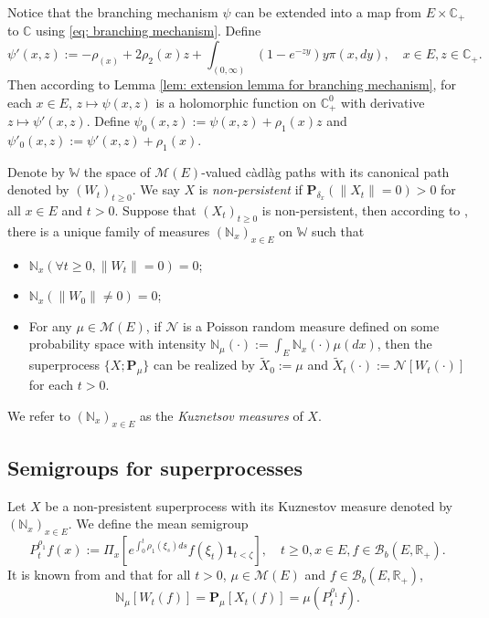 \documentclass[12pt,a4paper]{amsart}
\theoremstyle{plain}
\theoremstyle{definition}
\numberwithin{equation}{section}
\begin{document}
    Notice that the branching mechanism $\psi$ can be extended into a map from $E \times \mathbb C_+$ to $\mathbb C$ using \eqref{eq: branching mechanism}.
    Define
\begin{equation}
    \psi'(x,z):= - \rho_(x) + 2\rho_2(x) z + \int_{(0,\infty)} (1-e^{-zy})y\pi(x,dy),
    \quad x\in E, z\in \mathbb C_+.
\end{equation}
    Then according to Lemma \ref{lem: extension lemma for branching mechanism}, for each $x \in E$, $z \mapsto \psi(x,z)$ is a holomorphic function on $\mathbb C_+^0$ with derivative $z \mapsto \psi'(x,z)$.
    Define $\psi_0(x,z) := \psi(x,z)+ \rho_1(x)z $ and $\psi'_0(x,z) := \psi'(x,z) + \rho_1(x)$.

    Denote by $\mathbb W$ the space of $\mathcal M(E)$-valued c\`{a}dl\`{a}g paths with its canonical path denoted by $(W_t)_{t\geq 0}$.
    We say $X$ is \emph{non-persistent} if $\mathbf P_{\delta_x}(\|X_t\|= 0) > 0$ for all $x\in E$ and $t> 0$.
    Suppose that $(X_t)_{t\geq 0}$ is non-persistent, then according to \cite[Section 8.4]{Li2011Measure-valued},
    there is a unique family of measures $(\mathbb N_x)_{x\in E}$ on $\mathbb W$ such that
\begin{itemize}
\item
    $\mathbb N_x (\forall t \geq 0, \|W_t\|=0) =0$;
\item
    $\mathbb N_x(\|W_0 \|\neq 0) = 0$;
\item
    For any $\mu \in \mathcal M(E)$, if $\mathcal N$ is a Poisson random measure defined on some probability space
    with intensity $\mathbb N_\mu(\cdot):= \int_E \mathbb N_x(\cdot )\mu(dx)$,
    then the superprocess $\{X;\mathbf P_\mu\}$ can be realized by $\widetilde X_0 := \mu$ and $\widetilde X_t(\cdot) := \mathcal N[W_t(\cdot)]$ for each $t>0$.
\end{itemize}
    We refer to $(\mathbb N_x)_{x\in E}$ as the \emph{Kuznetsov measures} of $X$.
\subsection{{Semigroups for superprocesses}}
\label{sec: definition of vf}
    Let $X$ be a non-presistent superprocess with its Kuznestov measure denoted by $(\mathbb N_x)_{x\in E}$.
    We define the mean semigroup
\begin{equation}
    P_t^{\rho_1} f(x)
    := \Pi_{x}[e^{\int_0^t \rho_1(\xi_s)ds}f(\xi_t) \mathbf 1_{t< \zeta}],
    \quad t\geq 0, x\in E, f\in \mathcal B_b(E,\mathbb R_+).
\end{equation}
    It is known from \cite[Proposition 2.27]{Li2011Measure-valued} and \cite[Theorem 2.7]{Kyprianou2014Fluctuations} that for all $t > 0$, $\mu \in \mathcal M(E)$ and $f\in \mathcal B_b(E,\mathbb R_+)$,
\begin{equation}
\label{eq: mean formula for superprocesses}
    \mathbb N_{\mu}[W_t(f)]
    =\mathbf P_{\mu}[X_t(f)]=
       \mu(P^{\rho_1}_t f).
\end{equation}
\end{document}
